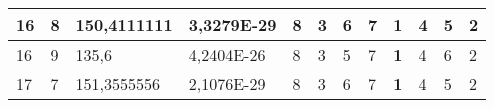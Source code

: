 \documentclass[conference]{IEEEtran}
\begin{document}
\begin{table*}[]
\begin{tabular}{|llll|llllllll|}
\multicolumn{1}{|l|}{16}                                                             & \multicolumn{1}{l|}{8}                                                                 & \multicolumn{1}{l|}{150,4111111}                                                           & 3,3279E-29                              & \multicolumn{1}{l|}{8}                                                           & \multicolumn{1}{l|}{3}                                                           & \multicolumn{1}{l|}{6}                                                           & \multicolumn{1}{l|}{7}                                                           & \multicolumn{1}{l|}{\textbf{1}}                                                  & \multicolumn{1}{l|}{4}                                                           & \multicolumn{1}{l|}{5}                                                           & 2                                   \\ \hline
\multicolumn{1}{|l|}{16}                                                             & \multicolumn{1}{l|}{9}                                                                 & \multicolumn{1}{l|}{135,6}                                                                 & 4,2404E-26                              & \multicolumn{1}{l|}{8}                                                           & \multicolumn{1}{l|}{3}                                                           & \multicolumn{1}{l|}{5}                                                           & \multicolumn{1}{l|}{7}                                                           & \multicolumn{1}{l|}{\textbf{1}}                                                  & \multicolumn{1}{l|}{4}                                                           & \multicolumn{1}{l|}{6}                                                           & 2                                   \\ \hline
\multicolumn{1}{|l|}{17}                                                             & \multicolumn{1}{l|}{7}                                                                 & \multicolumn{1}{l|}{151,3555556}                                                           & 2,1076E-29                              & \multicolumn{1}{l|}{8}                                                           & \multicolumn{1}{l|}{3}                                                           & \multicolumn{1}{l|}{6}                                                           & \multicolumn{1}{l|}{7}                                                           & \multicolumn{1}{l|}{\textbf{1}}                                                  & \multicolumn{1}{l|}{4}                                                           & \multicolumn{1}{l|}{5}                                                           & 2                                   \\ \hline

\end{tabular}
\end{table*}
\end{document}
